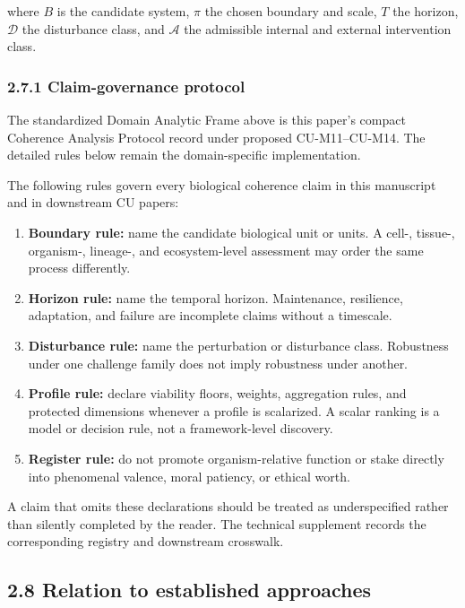 \documentclass[
  11pt,
]{article}
\providecommand{\tightlist}{%
  \setlength{\itemsep}{0pt}\setlength{\parskip}{0pt}}
\begin{document}
where \(B\) is the candidate system, \(\pi\) the chosen boundary and
scale, \(T\) the horizon, \(\mathcal D\) the disturbance class, and
\(\mathcal A\) the admissible internal and external intervention class.

\subsubsection{2.7.1 Claim-governance
protocol}\label{claim-governance-protocol}

The standardized Domain Analytic Frame above is this paper's compact
Coherence Analysis Protocol record under proposed CU-M11--CU-M14. The
detailed rules below remain the domain-specific implementation.

The following rules govern every biological coherence claim in this
manuscript and in downstream CU papers:

\begin{enumerate}
\def\labelenumi{\arabic{enumi}.}
\tightlist
\item
  \textbf{Boundary rule:} name the candidate biological unit or units. A
  cell-, tissue-, organism-, lineage-, and ecosystem-level assessment
  may order the same process differently.
\item
  \textbf{Horizon rule:} name the temporal horizon. Maintenance,
  resilience, adaptation, and failure are incomplete claims without a
  timescale.
\item
  \textbf{Disturbance rule:} name the perturbation or disturbance class.
  Robustness under one challenge family does not imply robustness under
  another.
\item
  \textbf{Profile rule:} declare viability floors, weights, aggregation
  rules, and protected dimensions whenever a profile is scalarized. A
  scalar ranking is a model or decision rule, not a framework-level
  discovery.
\item
  \textbf{Register rule:} do not promote organism-relative function or
  stake directly into phenomenal valence, moral patiency, or ethical
  worth.
\end{enumerate}

A claim that omits these declarations should be treated as
underspecified rather than silently completed by the reader. The
technical supplement records the corresponding registry and downstream
crosswalk.

\subsection{2.8 Relation to established
approaches}\label{relation-to-established-approaches}
\end{document}
